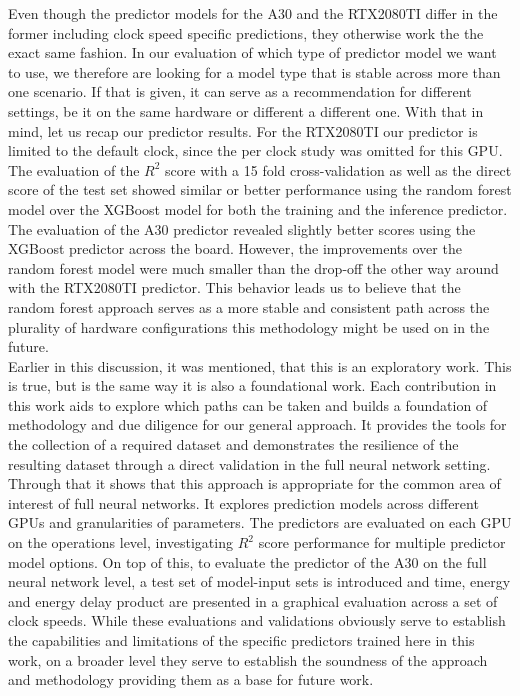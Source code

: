 Even though the predictor models for the A30 and the RTX2080TI differ in the former including clock speed specific predictions, they otherwise work the the exact same fashion. In our evaluation of which type of predictor model we want to use, we therefore are looking for a model type that is stable across more than one scenario. If that is given, it can serve as a recommendation for different settings, be it on the same hardware or different a different one. With that in mind, let us recap our predictor results. For the RTX2080TI our predictor is limited to the default clock, since the per clock study was omitted for this GPU. The evaluation of the $R^2$ score with a 15 fold cross-validation as well as the direct score of the test set showed similar or better performance using the random forest model over the XGBoost model for both the training and the inference predictor. The evaluation of the A30 predictor revealed slightly better scores using the XGBoost predictor across the board. However, the improvements over the random forest model were much smaller than the drop-off the other way around with the RTX2080TI predictor. This behavior leads us to believe that the random forest approach serves as a more stable and consistent path across the plurality of hardware configurations this methodology might be used on in the future. \\
Earlier in this discussion, it was mentioned, that this is an exploratory work. This is true, but is the same way it is also a foundational work. Each contribution in this work aids to explore which paths can be taken and builds a foundation of methodology and due diligence for our general approach. It provides the tools for the collection of a required dataset and demonstrates the resilience of the resulting dataset through a direct validation in the full neural network setting. Through that it shows that this approach is appropriate for the common area of interest of full neural networks. It explores prediction models across different GPUs and granularities of parameters. The predictors are evaluated on each GPU on the operations level, investigating $R^2$ score performance for multiple predictor model options. On top of this, to evaluate the predictor of the A30 on the full neural network level, a test set of model-input sets is introduced and time, energy and energy delay product are presented in a graphical evaluation across a set of clock speeds. While these evaluations and validations obviously serve to establish the capabilities and limitations of the specific predictors trained here in this work, on a broader level they serve to establish the soundness of the approach and methodology providing them as a base for future work.

